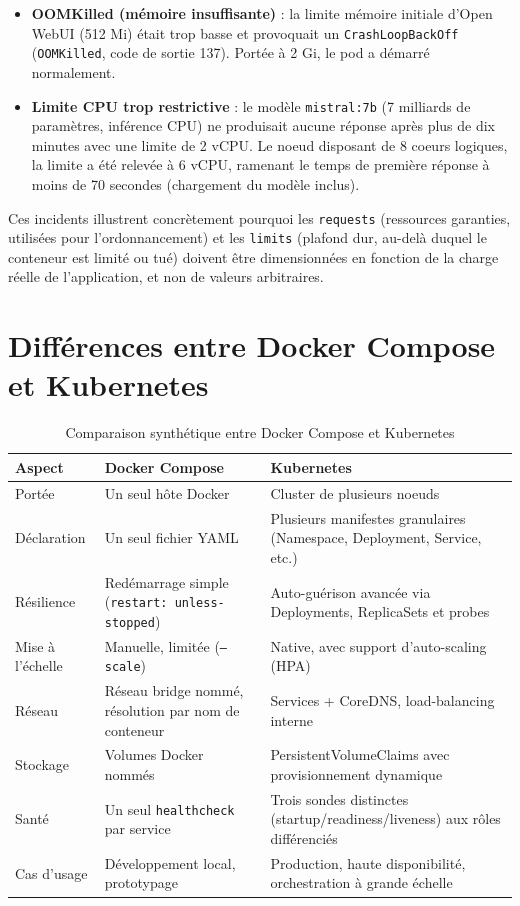 ﻿\documentclass[11pt,a4paper]{article}
\begin{document}
\begin{itemize}
    \item \textbf{OOMKilled (mémoire insuffisante)} : la limite mémoire initiale d'Open WebUI (512 Mi) était trop basse et provoquait un \texttt{CrashLoopBackOff} (\texttt{OOMKilled}, code de sortie 137). Portée à 2 Gi, le pod a démarré normalement.
    \item \textbf{Limite CPU trop restrictive} : le modèle \texttt{mistral:7b} (7 milliards de paramètres, inférence CPU) ne produisait aucune réponse après plus de dix minutes avec une limite de 2 vCPU. Le noeud disposant de 8 coeurs logiques, la limite a été relevée à 6 vCPU, ramenant le temps de première réponse à moins de 70 secondes (chargement du modèle inclus).
\end{itemize}

Ces incidents illustrent concrètement pourquoi les \texttt{requests} (ressources garanties, utilisées pour l'ordonnancement) et les \texttt{limits} (plafond dur, au-delà duquel le conteneur est limité ou tué) doivent être dimensionnées en fonction de la charge réelle de l'application, et non de valeurs arbitraires.

\section{Différences entre Docker Compose et Kubernetes}

\begin{table}[h]
\centering
\small
\begin{tabular}{@{}p{4.2cm}p{5.3cm}p{5.3cm}@{}}
\toprule
\textbf{Aspect} & \textbf{Docker Compose} & \textbf{Kubernetes} \\
\midrule
Portée & Un seul hôte Docker & Cluster de plusieurs noeuds \\
Déclaration & Un seul fichier YAML & Plusieurs manifestes granulaires (Namespace, Deployment, Service, etc.) \\
Résilience & Redémarrage simple (\texttt{restart: unless-stopped}) & Auto-guérison avancée via Deployments, ReplicaSets et probes \\
Mise à l'échelle & Manuelle, limitée (\texttt{--scale}) & Native, avec support d'auto-scaling (HPA) \\
Réseau & Réseau bridge nommé, résolution par nom de conteneur & Services + CoreDNS, load-balancing interne \\
Stockage & Volumes Docker nommés & PersistentVolumeClaims avec provisionnement dynamique \\
Santé & Un seul \texttt{healthcheck} par service & Trois sondes distinctes (startup/readiness/liveness) aux rôles différenciés \\
Cas d'usage & Développement local, prototypage & Production, haute disponibilité, orchestration à grande échelle \\
\bottomrule
\end{tabular}
\caption{Comparaison synthétique entre Docker Compose et Kubernetes}
\end{table}
\end{document}
